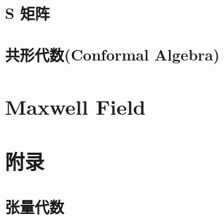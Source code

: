 \documentclass{article}
\begin{document}
\subsection{S 矩阵}

\subsection{共形代数(Conformal Algebra)}




\section{Maxwell Field}































\section{附录}
\subsection{张量代数}
\end{document}
